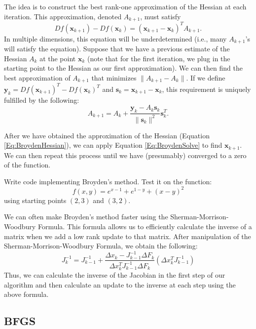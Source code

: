 The idea is to construct the best rank-one approximation of the Hessian at each iteration. This approximation, denoted $A_{k+1}$, must satisfy
\begin{equation} \label{Eq:BroydenRestraint}
Df(\mathbf{x}_{k+1})-Df(\mathbf{x}_k)=(\mathbf{x}_{k+1}-\mathbf{x}_k)^TA_{k+1}.
\end{equation}
In multiple dimensions, this equation will be underdetermined (i.e., many $A_{k+1}$'s will satisfy the equation). Suppose that we have a previous estimate of the Hessian $A_k$ at the point $\mathbf{x}_k$ (note that for the first iteration, we plug in the starting point to the Hessian as our first approximation). We can then find the best approximation of $A_{k+1}$ that minimizes $\|A_{k+1}-A_k\|$. If we define $\mathbf{y}_k = Df(\mathbf{x}_{k+1})^T-Df(\mathbf{x}_k)^T$ and $\mathbf{s}_k=\mathbf{x}_{k+1}-\mathbf{x}_k$, this requirement is uniquely fulfilled by the following:
\begin{equation} \label{Eq:BroydenHessian}
A_{k+1} = A_k + \frac{\mathbf{y}_k-A_k\mathbf{s}_k}{\|\mathbf{s}_k\|^2}\mathbf{s}_k^T.
\end{equation}

After we have obtained the approximation of the Hessian (Equation \ref{Eq:BroydenHessian}), we can apply Equation \ref{Eq:BroydenSolve} to find $\mathbf{x}_{k+1}$. We can then repeat this process until we have (presumably) converged to a zero of the function.

\begin{problem}
Write code implementing Broyden's method. Test it on the function:
\[
f(x,y) = e^{x-1}+e^{1-y}+(x-y)^2
\]
using starting points $(2,3)$ and $(3,2)$.
\end{problem}

\begin{info}
We can often make Broyden's method faster using the Sherman-Morrison-Woodbury Formula.
This formula allows us to efficiently calculate the inverse of a matrix when we add
a low rank update to that matrix. After manipulation of the Sherman-Morrison-Woodbury
Formula, we obtain the following:
\[
J_k^{-1} = J_{k-1}^{-1} + \frac{\Delta x_k - J_{k-1}^{-1}\Delta F_k}{\Delta x_k^T J_{k-1}^{-1}\Delta F_k} (\Delta x_k^T J_{k-1}^{-1})
\]
Thus, we can calculate the inverse of the Jacobian in the first step of our algorithm
and then calculate an update to the inverse at each step using the above formula.
\end{info}

\subsection*{BFGS}

